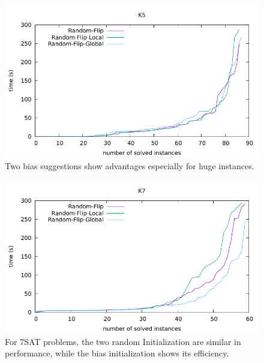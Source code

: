 \documentclass[12pt,a4paper,twoside]{scrartcl}
\numberwithin{equation}{section}
\begin{document}
  \begin{figure}[H]
\begin{center}
  \includegraphics[scale = 1]{DATA/K5/e3r.pdf}
  \end{center}
  \caption{Two bias suggestions show advantages especially for huge instances.}
  \label{Experiment 5 k5 cactus plot} 
  \end{figure}
  \begin{figure}[H]
\begin{center}
  \includegraphics[scale = 1]{DATA/K7/e3r.pdf}
  \end{center}
  \caption{For 7SAT problems, the two random Initialization are similar in performance, while the bias initialization shows its efficiency.}
  \label{Experiment 5 k7 cactus plot}
  \end{figure}
\end{document}
